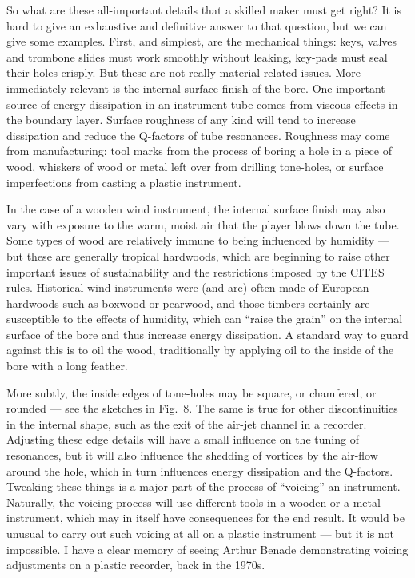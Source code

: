   So what are these all-important details that a skilled maker must get right? 
  It is hard to give an exhaustive and definitive answer to that question, but 
  we can give some examples. First, and simplest, are the mechanical things: 
  keys, valves and trombone slides must work smoothly without leaking, key-pads 
  must seal their holes crisply. But these are not really material-related 
  issues. More immediately relevant is the internal surface finish of the bore. 
  One important source of energy dissipation in an instrument tube comes from 
  viscous effects in the boundary layer. Surface roughness of any kind will 
  tend to increase dissipation and reduce the Q-factors of tube resonances. 
  Roughness may come from manufacturing: tool marks from the process of boring 
  a hole in a piece of wood, whiskers of wood or metal left over from drilling 
  tone-holes, or surface imperfections from casting a plastic instrument. 

  In the case of a wooden wind instrument, the internal surface finish may also 
  vary with exposure to the warm, moist air that the player blows down the 
  tube. Some types of wood are relatively immune to being influenced by 
  humidity — but these are generally tropical hardwoods, which are beginning to 
  raise other important issues of sustainability and the restrictions imposed 
  by the CITES rules. Historical wind instruments were (and are) often made of 
  European hardwoods such as boxwood or pearwood, and those timbers certainly 
  are susceptible to the effects of humidity, which can “raise the grain” on 
  the internal surface of the bore and thus increase energy dissipation. A 
  standard way to guard against this is to oil the wood, traditionally by 
  applying oil to the inside of the bore with a long feather. 

  More subtly, the inside edges of tone-holes may be square, or chamfered, or 
  rounded — see the sketches in Fig.\ 8. The same is true for other 
  discontinuities in the internal shape, such as the exit of the air-jet 
  channel in a recorder. Adjusting these edge details will have a small 
  influence on the tuning of resonances, but it will also influence the 
  shedding of vortices by the air-flow around the hole, which in turn 
  influences energy dissipation and the Q-factors. Tweaking these things is a 
  major part of the process of “voicing” an instrument. Naturally, the voicing 
  process will use different tools in a wooden or a metal instrument, which may 
  in itself have consequences for the end result. It would be unusual to carry 
  out such voicing at all on a plastic instrument — but it is not impossible. I 
  have a clear memory of seeing Arthur Benade demonstrating voicing adjustments 
  on a plastic recorder, back in the 1970s. 

